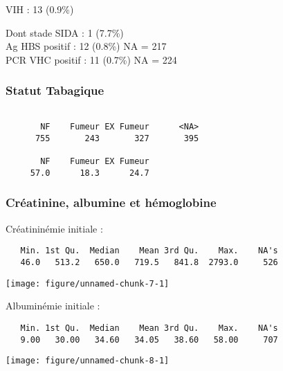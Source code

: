 \documentclass[11pt,a4paper]{article}\usepackage[]{graphicx}\usepackage[]{color}
\makeatletter
\def\maxwidth{ %
  \ifdim\Gin@nat@width>\linewidth
    \linewidth
  \else
    \Gin@nat@width
  \fi
}
\newenvironment{kframe}{%
 \def\at@end@of@kframe{}%
 \ifinner\ifhmode%
  \def\at@end@of@kframe{\end{minipage}}%
  \begin{minipage}{\columnwidth}%
 \fi\fi%
 \def\FrameCommand##1{\hskip\@totalleftmargin \hskip-\fboxsep
 \colorbox{shadecolor}{##1}\hskip-\fboxsep
     \hskip-\linewidth \hskip-\@totalleftmargin \hskip\columnwidth}%
 \MakeFramed {\advance\hsize-\width
   \@totalleftmargin\z@ \linewidth\hsize
   \@setminipage}}%
 {\par\unskip\endMakeFramed%
 \at@end@of@kframe}
\newenvironment{knitrout}{}{} %
\makeatother
\begin{document}
VIH : 13 (0.9\%)

Dont stade SIDA : 1 (7.7\%)
~\\

Ag HBS positif : 12 (0.8\%) NA = 217
~\\

PCR VHC positif : 11 (0.7\%) NA = 224


    \subsubsection{Statut Tabagique}

\begin{knitrout}
\color{fgcolor}\begin{kframe}
\begin{verbatim}

       NF    Fumeur EX Fumeur      <NA> 
      755       243       327       395 

       NF    Fumeur EX Fumeur 
     57.0      18.3      24.7 
\end{verbatim}
\end{kframe}
\end{knitrout}

    \subsubsection{Créatinine, albumine et hémoglobine}

Créatininémie initiale :

\begin{knitrout}
\color{fgcolor}\begin{kframe}
\begin{verbatim}
   Min. 1st Qu.  Median    Mean 3rd Qu.    Max.    NA's 
   46.0   513.2   650.0   719.5   841.8  2793.0     526 
\end{verbatim}
\end{kframe}
\texttt{[image: figure/unnamed-chunk-7-1]} 

\end{knitrout}

Albuminémie initiale :

\begin{knitrout}
\color{fgcolor}\begin{kframe}
\begin{verbatim}
   Min. 1st Qu.  Median    Mean 3rd Qu.    Max.    NA's 
   9.00   30.00   34.60   34.05   38.60   58.00     707 
\end{verbatim}
\end{kframe}
\texttt{[image: figure/unnamed-chunk-8-1]} 

\end{knitrout}
\end{document}
